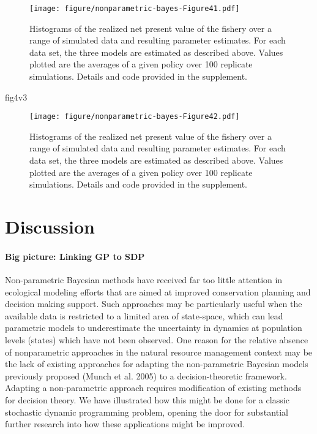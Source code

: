 \documentclass[author-year, review]{elsarticle} %
\makeatletter
\newenvironment{Shaded}{}{}
\newcommand{\NormalTok}[1]{{#1}}
\def\maxwidth{\ifdim\Gin@nat@width>\linewidth\linewidth
\else\Gin@nat@width\fi}
\let\Oldincludegraphics\includegraphics
\renewcommand{\includegraphics}[1]{\Oldincludegraphics[width=\maxwidth]{#1}}
\makeatother
\begin{document}
\begin{figure}[htbp]
\centering
\texttt{[image: figure/nonparametric-bayes-Figure41.pdf]}
\caption{Histograms of the realized net present value of the fishery
over a range of simulated data and resulting parameter estimates. For
each data set, the three models are estimated as described above. Values
plotted are the averages of a given policy over 100 replicate
simulations. Details and code provided in the supplement.}
\end{figure}

\begin{Shaded}
\begin{Highlighting}[]
\NormalTok{fig4v3}
\end{Highlighting}
\end{Shaded}

\begin{figure}[htbp]
\centering
\texttt{[image: figure/nonparametric-bayes-Figure42.pdf]}
\caption{Histograms of the realized net present value of the fishery
over a range of simulated data and resulting parameter estimates. For
each data set, the three models are estimated as described above. Values
plotted are the averages of a given policy over 100 replicate
simulations. Details and code provided in the supplement.}
\end{figure}

\section{Discussion}

\paragraph{Big picture: Linking GP to SDP}

Non-parametric Bayesian methods have received far too little attention
in ecological modeling efforts that are aimed at improved conservation
planning and decision making support. Such approaches may be
particularly useful when the available data is restricted to a limited
area of state-space, which can lead parametric models to underestimate
the uncertainty in dynamics at population levels (states) which have not
been observed. One reason for the relative absence of nonparametric
approaches in the natural resource management context may be the lack of
existing approaches for adapting the non-parametric Bayesian models
previously proposed (Munch et al. 2005) to a decision-theoretic
framework. Adapting a non-parametric approach requires modification of
existing methods for decision theory. We have illustrated how this might
be done for a classic stochastic dynamic programming problem, opening
the door for substantial further research into how these applications
might be improved.
\end{document}

